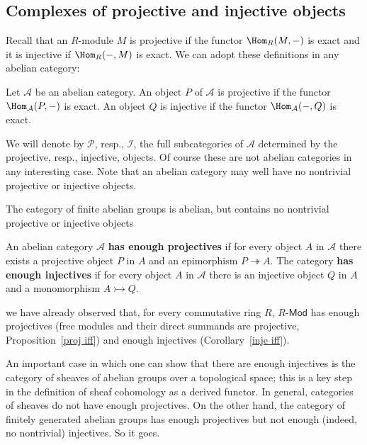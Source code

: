\subsection{Complexes of projective and injective objects}
Recall that an $R$-module $M$ is projective if the functor $\Hom_R(M,-)$ is exact and it is injective if $\Hom_R(-,M)$ is exact. We can adopt these definitions in any abelian category:
\begin{definition}
Let $\mathcal{A}$ be an abelian category. An object $P$ of $\mathcal{A}$ is projective if the functor $\Hom_\mathcal{A}(P,-)$ is exact. An object $Q$ is injective if the functor $\Hom_\mathcal{A}(-,Q)$ is
exact.
\end{definition}
We will denote by $\mathcal{P}$, resp., $\mathcal{I}$, the full subcategories of $\mathcal{A}$ determined by the projective, resp., injective, objects. Of course these are not abelian categories in
any interesting case. Note that an abelian category may well have no nontrivial projective or injective objects.
\begin{example}
The category of finite abelian groups is abelian, but contains no nontrivial projective or injective objects
\end{example}
\begin{definition}
An abelian category $\mathcal{A}$ \textbf{has enough projectives} if for every object $A$ in $\mathcal{A}$ there exists a projective object $P$ in $A$ and an epimorphism $P\twoheadrightarrow A$. The category \textbf{has enough injectives} if for every object $A$ in $\mathcal{A}$ there is an injective object $Q$ in $A$ and a monomorphism $A\rightarrowtail Q$.
\end{definition}
we have already observed that, for every commutative ring $R$, $R$-$\mathsf{Mod}$ has enough projectives (free modules and their direct summands are projective, Proposition~\ref{proj iff}) and enough injectives (Corollary~\ref{inje iff}).\par
An important case in which one can show that there are enough injectives is the category of sheaves of abelian groups over a topological space; this is a key step in the definition of sheaf cohomology as a derived functor. In general, categories of sheaves do not have enough projectives. On the other hand,
the category of finitely generated abelian groups has enough projectives but not enough (indeed, no nontrivial) injectives. So it goes.
